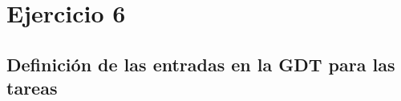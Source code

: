 \section{Ejercicio 6}
\par{}

\subsection*{Definición de las entradas en la GDT para las tareas}
\par{}


\subsection*{}
\par{}

\clearpage